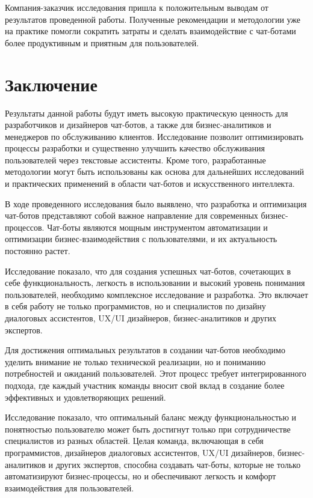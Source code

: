 \documentclass{article}
\begin{document}
Компания-заказчик исследования пришла к положительным выводам от результатов проведенной работы. Полученные рекомендации и методологии уже на практике помогли сократить затраты и сделать взаимодействие с чат-ботами более продуктивным и приятным для пользователей.
\section{Заключение}
Результаты данной работы будут иметь высокую практическую ценность для разработчиков и дизайнеров чат-ботов, а также для бизнес-аналитиков и менеджеров по обслуживанию клиентов. Исследование позволит оптимизировать процессы разработки и существенно улучшить качество обслуживания пользователей через текстовые ассистенты. Кроме того, разработанные методологии могут быть использованы как основа для дальнейших исследований и практических применений в области чат-ботов и искусственного интеллекта.

В ходе проведенного исследования было выявлено, что разработка и оптимизация чат-ботов представляют собой важное направление для современных бизнес-процессов. Чат-боты являются мощным инструментом автоматизации и оптимизации бизнес-взаимодействия с пользователями, и их актуальность постоянно растет.

Исследование показало, что для создания успешных чат-ботов, сочетающих в себе функциональность, легкость в использовании и высокий уровень понимания пользователей, необходимо комплексное исследование и разработка. Это включает в себя работу не только программистов, но и специалистов по дизайну диалоговых ассистентов, UX/UI дизайнеров, бизнес-аналитиков и других экспертов.

Для достижения оптимальных результатов в создании чат-ботов необходимо уделить внимание не только технической реализации, но и пониманию потребностей и ожиданий пользователей. Этот процесс требует интегрированного подхода, где каждый участник команды вносит свой вклад в создание более эффективных и удовлетворяющих решений.

Исследование показало, что оптимальный баланс между функциональностью и понятностью пользователю может быть достигнут только при сотрудничестве специалистов из разных областей. Целая команда, включающая в себя программистов, дизайнеров диалоговых ассистентов, UX/UI дизайнеров, бизнес-аналитиков и других экспертов, способна создавать чат-боты, которые не только автоматизируют бизнес-процессы, но и обеспечивают легкость и комфорт взаимодействия для пользователей.
\end{document}
